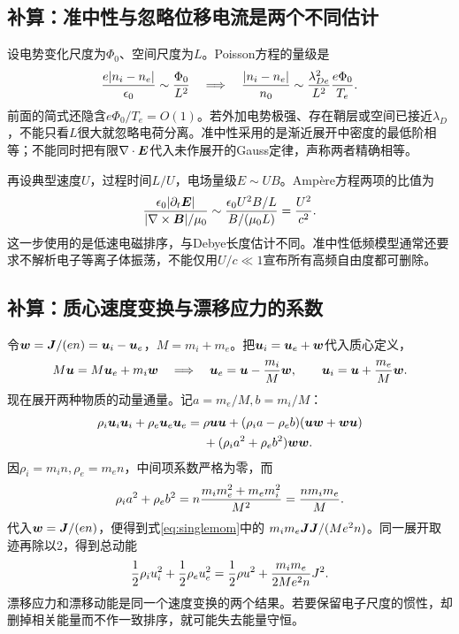 \documentclass[UTF8,a4paper,11pt,openany,fontset=fandol]{ctexbook}
\begin{document}
\subsection{补算：准中性与忽略位移电流是两个不同估计}
设电势变化尺度为$\Phi_0$、空间尺度为$L$。Poisson方程的量级是
\begin{equation}
 {e|n_i-n_e|\over\epsilon_0}\sim{\Phi_0\over L^2}
 \quad\Longrightarrow\quad
 {|n_i-n_e|\over n_0}
 \sim{\lambda_{De}^2\over L^2}{e\Phi_0\over T_e}.
\end{equation}
前面的简式还隐含$e\Phi_0/T_e=O(1)$。若外加电势极强、存在鞘层或空间已接近$\lambda_D$，不能只看$L$很大就忽略电荷分离。准中性采用的是渐近展开中密度的最低阶相等；不能同时把有限$\nabla\cdot\bm{E}$代入未作展开的Gauss定律，声称两者精确相等。

再设典型速度$U$，过程时间$L/U$，电场量级$E\sim UB$。Ampère方程两项的比值为
\begin{equation}
 {\epsilon_0|\partial_t\bm{E}|\over|\nabla\times\bm{B}|/\mu_0}
 \sim{\epsilon_0U^2B/L\over B/(\mu_0L)}
 ={U^2\over c^2}.
\end{equation}
这一步使用的是低速电磁排序，与Debye长度估计不同。准中性低频模型通常还要求不解析电子等离子体振荡，不能仅用$U/c\ll1$宣布所有高频自由度都可删除。

\subsection{补算：质心速度变换与漂移应力的系数}
令$\bm{w}=\bm{J}/(en)=\bm{u}_i-\bm{u}_e$，$M=m_i+m_e$。把$\bm{u}_i=\bm{u}_e+\bm{w}$代入质心定义，
\begin{equation}
 M\bm{u}=M\bm{u}_e+m_i\bm{w}
 \quad\Longrightarrow\quad
 \bm{u}_e=\bm{u}-{m_i\over M}\bm{w},\qquad
 \bm{u}_i=\bm{u}+{m_e\over M}\bm{w}.
\end{equation}
现在展开两种物质的动量通量。记$a=m_e/M,b=m_i/M$：
\begin{align}
 \rho_i\bm{u}_i\bm{u}_i+\rho_e\bm{u}_e\bm{u}_e
 ={}&\rho\bm{u}\bm{u}+
 (\rho_i a-\rho_e b)(\bm{u}\bm{w}+\bm{w}\bm{u})\\
 &+(\rho_i a^2+\rho_e b^2)\bm{w}\bm{w}.\nonumber
\end{align}
因$\rho_i=m_in,\rho_e=m_en$，中间项系数严格为零，而
\begin{equation}
 \rho_i a^2+\rho_e b^2
 =n{m_im_e^2+m_em_i^2\over M^2}
 ={nm_im_e\over M}.
\end{equation}
代入$\bm{w}=\bm{J}/(en)$，便得到式\eqref{eq:singlemom}中的
$m_im_e\bm{J}\bm{J}/(Me^2n)$。同一展开取迹再除以2，得到总动能
\begin{equation}
 {1\over2}\rho_iu_i^2+{1\over2}\rho_eu_e^2
 ={1\over2}\rho u^2+{m_im_e\over2Me^2n}J^2.
 \label{eq:tutorial-drift}
\end{equation}
漂移应力和漂移动能是同一个速度变换的两个结果。若要保留电子尺度的惯性，却删掉相关能量而不作一致排序，就可能失去能量守恒。
\end{document}
